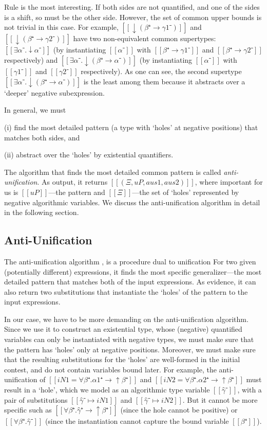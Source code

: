 Rule  is the most 
interesting. If both sides are not quantified, and one of the sides is 
a shift, so must be the other side. 
However, the set of common upper bounds is not trivial in this case.
For example, $[[↓(β⁺ → γ1⁻)]]$ and $[[↓(β⁺ → γ2⁻)]]$ have
two non-equivalent common supertypes: 
$[[∃α⁻.↓α⁻]]$ 
(by instantiating $[[α⁻]]$ with $[[β⁺ → γ1⁻]]$ and $[[β⁺ → γ2⁻]]$ respectively)
and 
$[[∃α⁻.↓(β⁺ → α⁻)]]$ 
(by instantiating $[[α⁻]]$ with $[[γ1⁻]]$ and $[[γ2⁻]]$ respectively).
As one can see, the second supertype $[[∃α⁻.↓(β⁺ → α⁻)]]$ is the least among them
because it abstracts over a `deeper' negative subexpression.

In general, we must 
\begin{itemize*}
  \item[(i)] find the most detailed pattern (a type with `holes' at negative positions) 
    that matches both sides, and 
  \item[(ii)] abstract over the `holes' by existential quantifiers.
\end{itemize*}
The algorithm that finds the most detailed common pattern is called \emph{anti-unification}.
As output, it returns $[[(Ξ, uP, aus1, aus2)]]$, where important for us is
$[[uP]]$---the pattern and $[[Ξ]]$---the set of `holes' represented by negative algorithmic variables.
We discuss the anti-unification algorithm in detail in the following section.


\subsection{Anti-Unification}
\label{sec:antiunification}

The anti-unification algorithm \cite{plotkin1970:generalization,reynolds1970:transform}, 
is a procedure dual to unification
For two given (potentially different) expressions, 
it finds the most specific generalizer---the most detailed pattern that 
matches both of the input expressions. As evidence, it can also return 
two substitutions that instantiate the `holes' of the pattern to the input expressions.

In our case, we have to be more demanding on the anti-unification algorithm.
Since we use it to construct an existential type, whose (negative) quantified variables
can only be instantiated with negative types, we must make sure that the pattern 
has `holes' only at negative positions. Moreover, we must make sure that
the resulting substitutions for the `holes' are well-formed in the initial contest, 
and do not contain variables bound later. For example, 
the anti-unification of $[[iN1 = ∀β⁺.α1⁺ → ↑β⁺]]$ and
$[[iN2 = ∀β⁺.α2⁺ → ↑β⁺]]$
must result in a `hole', which we model as an algorithmic type variable $[[γ̂⁻]]$, 
with a pair of substitutions $[[γ̂⁻ ↦ iN1]]$ and $[[γ̂⁻ ↦ iN2]]$.
But it cannot be more specific such as
$[[∀β⁺.γ̂⁺ → ↑β⁺]]$ (since the hole cannot be positive)
or $[[∀β⁺.γ̂⁻]]$ 
(since the instantiation cannot capture the bound variable $[[β⁺]]$).


